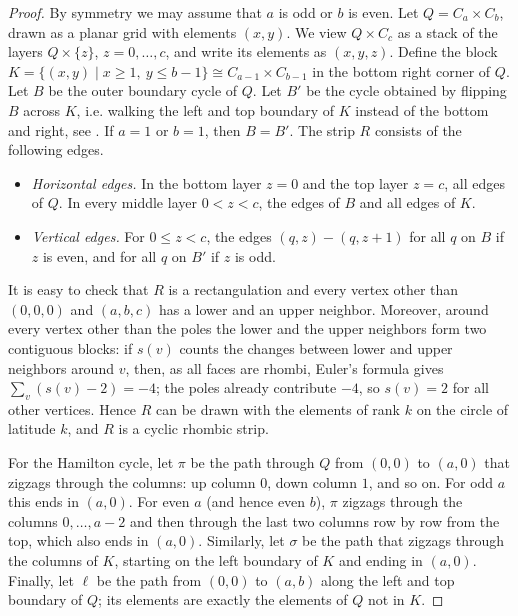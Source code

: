 \documentclass[fontsize=11pt,a4paper,DIV=12]{scrartcl}
\begin{document}
\begin{proof}
	By symmetry we may assume that $a$ is odd or $b$ is even. Let $Q=C_a\times C_b$, drawn as a planar grid with elements $(x,y)$. We view $Q\times C_c$ as a stack of the layers $Q\times\{z\}$, $z=0,\ldots,c$, and write its elements as $(x,y,z)$. Define the block $K=\{(x,y)\mid x\ge 1,\ y\le b-1\}\cong C_{a-1}\times C_{b-1}$ in the bottom right corner of $Q$. Let $B$ be the outer boundary cycle of $Q$. Let $B'$ be the cycle obtained by flipping $B$ across $K$, i.e. walking the left and top boundary of $K$ instead of the bottom and right, see . If $a=1$ or $b=1$, then $B=B'$. The strip $R$ consists of the following edges.
	\begin{itemize}
		\item \emph{Horizontal edges.} In the bottom layer $z=0$ and the top layer $z=c$, all edges of $Q$. In every middle layer $0<z<c$, the edges of $B$ and all edges of $K$.
		\item \emph{Vertical edges.} For $0\le z<c$, the edges $(q,z)-(q,z+1)$ for all $q$ on $B$ if $z$ is even, and for all $q$ on $B'$ if $z$ is odd.
	\end{itemize}

	It is easy to check that $R$ is a rectangulation and every vertex other than $(0,0,0)$ and $(a,b,c)$ has a lower and an upper neighbor. Moreover, around every vertex other than the poles the lower and the upper neighbors form two contiguous blocks: if $s(v)$ counts the changes between lower and upper neighbors around $v$, then, as all faces are rhombi, Euler's formula gives $\sum_v(s(v)-2)=-4$; the poles already contribute $-4$, so $s(v)=2$ for all other vertices. Hence $R$ can be drawn with the elements of rank $k$ on the circle of latitude $k$, and $R$ is a cyclic rhombic strip.

	For the Hamilton cycle, let $\pi$ be the path through $Q$ from $(0,0)$ to $(a,0)$ that zigzags through the columns: up column $0$, down column
	$1$, and so on. For odd $a$ this ends in $(a,0)$. For even $a$ (and hence even $b$), $\pi$ zigzags through the columns $0,\ldots,a-2$ and then
	through the last two columns row by row from the top, which also ends in $(a,0)$. Similarly, let $\sigma$ be the path that zigzags through the
	columns of $K$, starting on the left boundary of $K$ and ending in $(a,0)$. Finally, let $\ell$ be the path from $(0,0)$ to $(a,b)$ along the left
	and top boundary of $Q$; its elements are exactly the elements of $Q$ not in $K$.


\end{proof}
\end{document}
